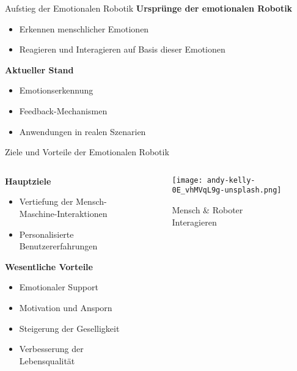 \documentclass[aspectratio=169]{beamer}
\begin{document}
\begin{frame}{Aufstieg der Emotionalen Robotik}
  \textbf{Ursprünge der emotionalen Robotik}
  \begin{itemize}
    \item Erkennen menschlicher Emotionen
    \item Reagieren und Interagieren auf Basis dieser Emotionen
  \end{itemize}
  \vspace*{.5cm}

  \textbf{Aktueller Stand}
  \begin{itemize}
    \item Emotionserkennung
    \item Feedback-Mechanismen
    \item Anwendungen in realen Szenarien
  \end{itemize}
\end{frame}

\begin{frame}{Ziele und Vorteile der Emotionalen Robotik}
  \begin{columns}
    \begin{column}{0.6\textwidth}
      \textbf{Hauptziele}
      \begin{itemize}
        \item Vertiefung der Mensch-Maschine-Interaktionen
        \item Personalisierte Benutzererfahrungen
      \end{itemize}
      \vspace*{.5cm}

      \textbf{Wesentliche Vorteile}
      \begin{itemize}
        \item Emotionaler Support
        \item Motivation und Ansporn
        \item Steigerung der Geselligkeit
        \item Verbesserung der Lebensqualität
      \end{itemize}
    \end{column}
    \begin{column}{0.4\textwidth}
      \begin{figure}[h]
        \centering
        \texttt{[image: andy-kelly-0E\_vhMVqL9g-unsplash.png]}
        \caption{Mensch \& Roboter Interagieren}
      \end{figure}
    \end{column}
  \end{columns}
\end{frame}
\end{document}
